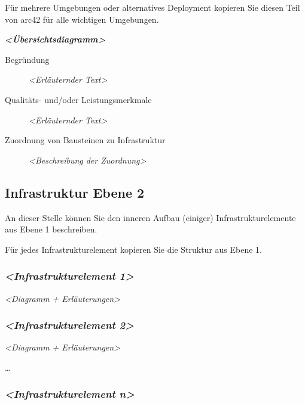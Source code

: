 \documentclass[]{article}
\begin{document}
Für mehrere Umgebungen oder alternatives Deployment kopieren Sie diesen
Teil von arc42 für alle wichtigen Umgebungen.

\emph{\textbf{\textless{}Übersichtsdiagramm\textgreater{}}}

\begin{description}
\item[Begründung]
\emph{\textless{}Erläuternder Text\textgreater{}}
\item[Qualitäts- und/oder Leistungsmerkmale]
\emph{\textless{}Erläuternder Text\textgreater{}}
\item[Zuordnung von Bausteinen zu Infrastruktur]
\emph{\textless{}Beschreibung der Zuordnung\textgreater{}}
\end{description}

\subsection{Infrastruktur Ebene 2}\label{_infrastruktur_ebene_2}

An dieser Stelle können Sie den inneren Aufbau (einiger)
Infrastrukturelemente aus Ebene 1 beschreiben.

Für jedes Infrastrukturelement kopieren Sie die Struktur aus Ebene 1.

\subsubsection{\texorpdfstring{\emph{\textless{}Infrastrukturelement
1\textgreater{}}}{\textless{}Infrastrukturelement 1\textgreater{}}}\label{__emphasis_infrastrukturelement_1_emphasis}

\emph{\textless{}Diagramm + Erläuterungen\textgreater{}}

\subsubsection{\texorpdfstring{\emph{\textless{}Infrastrukturelement
2\textgreater{}}}{\textless{}Infrastrukturelement 2\textgreater{}}}\label{__emphasis_infrastrukturelement_2_emphasis}

\emph{\textless{}Diagramm + Erläuterungen\textgreater{}}

\ldots{}

\subsubsection{\texorpdfstring{\emph{\textless{}Infrastrukturelement
n\textgreater{}}}{\textless{}Infrastrukturelement n\textgreater{}}}\label{__emphasis_infrastrukturelement_n_emphasis}
\end{document}

